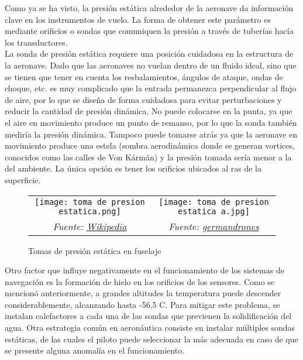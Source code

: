 Como ya se ha visto, la presión estática alrededor de la aeronave da información clave en los instrumentos de vuelo. La forma de obtener este parámetro es mediante orificios o sondas que comuniquen la presión a través de tuberías hacía los transductores.\\

La sonda de presión estática requiere una posición cuidadosa en la estructura de la aeronave. Dado que las aeronaves no vuelan dentro de un fluido ideal, sino que se tienen que tener en cuenta los resbalamientos, ángulos de ataque, ondas de choque, etc. es muy complicado que la entrada permanezca perpendicular al flujo de aire, por lo que se diseña de forma cuidadosa para evitar perturbaciones y reducir la cantidad de presión dinámica. No puede colocarse en la punta, ya que el aire en movimiento produce un punto de remanso, por lo que la sonda también mediría la presión dinámica. Tampoco puede tomarse atrás ya que la aeronave en movimiento produce una estela (sombra aerodinámica donde se generan vortices, conocidos como las calles de Von Kármán) y la presión tomada sería menor a la del ambiente. La única opción es tener los orificios ubicados al ras de la superficie.
\begin{figure}[H]
    \centering
    \begin{tabular}{c c}  %
        \texttt{[image: toma de presion estatica.png]} & 
        \texttt{[image: toma de presion estatica a.jpg]} \\
        \textit{Fuente: \href{https://es.m.wikipedia.org/wiki/Archivo:Static ports (2650534383).jpg}{Wikipedia}} & \textit{Fuente: \href{https://www.germandrones.com/en/news/newsdetail/detail/tech-news-an-alternative-pitot-for-drones}{germandrones}}
    \end{tabular}
    \caption{Tomas de presión estática en fuselaje}
\end{figure}

Otro factor que influye negativamente en el funcionamiento de los sistemas de navegación es la formación de hielo en los orificios de los sensores. Como se mencionó anteriormente, a grandes altitudes la temperatura puede descender considerablemente, alcanzando hasta -56,5 \textdegree C. Para mitigar este problema, se instalan calefactores a cada una de las sondas que previenen la solidificación del agua. Otra estrategia común en aeronáutica consiste en instalar múltiples sondas estáticas, de las cuales el piloto puede seleccionar la más adecuada en caso de que se presente alguna anomalía en el funcionamiento.\\

